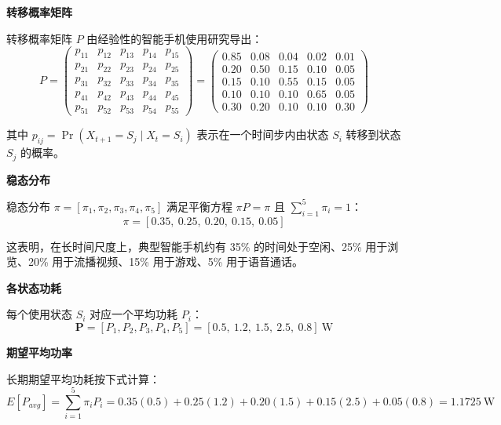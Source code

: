 \documentclass[11pt,a4paper]{ctexart}
\begin{document}
\textbf{转移概率矩阵}

转移概率矩阵 $P$ 由经验性的智能手机使用研究导出：
\begin{equation}
P = \begin{pmatrix}
p_{11} & p_{12} & p_{13} & p_{14} & p_{15}\\
p_{21} & p_{22} & p_{23} & p_{24} & p_{25}\\
p_{31} & p_{32} & p_{33} & p_{34} & p_{35}\\
p_{41} & p_{42} & p_{43} & p_{44} & p_{45}\\
p_{51} & p_{52} & p_{53} & p_{54} & p_{55}
\end{pmatrix}
= \begin{pmatrix}
0.85 & 0.08 & 0.04 & 0.02 & 0.01\\
0.20 & 0.50 & 0.15 & 0.10 & 0.05\\
0.15 & 0.10 & 0.55 & 0.15 & 0.05\\
0.10 & 0.10 & 0.10 & 0.65 & 0.05\\
0.30 & 0.20 & 0.10 & 0.10 & 0.30
\end{pmatrix} \tag{7}
\end{equation}

其中 $p_{ij} = \Pr\left(X_{t+1} = S_j \mid X_t = S_i\right)$ 表示在一个时间步内由状态 $S_i$ 转移到状态 $S_j$ 的概率。

\textbf{稳态分布}

稳态分布 $\pi = [\pi_1, \pi_2, \pi_3, \pi_4, \pi_5]$ 满足平衡方程 $\pi P = \pi$ 且 $\sum_{i=1}^{5}\pi_i = 1$：
\begin{equation}
\pi = [0.35,\ 0.25,\ 0.20,\ 0.15,\ 0.05] \tag{8}
\end{equation}

这表明，在长时间尺度上，典型智能手机约有 35\% 的时间处于空闲、25\% 用于浏览、20\% 用于流播视频、15\% 用于游戏、5\% 用于语音通话。

\textbf{各状态功耗}

每个使用状态 $S_i$ 对应一个平均功耗 $P_i$：
\begin{equation}
\mathbf{P} = [P_1, P_2, P_3, P_4, P_5] = [0.5,\ 1.2,\ 1.5,\ 2.5,\ 0.8]\ \mathrm{W} \tag{9}
\end{equation}

\textbf{期望平均功率}

长期期望平均功耗按下式计算：
\begin{equation}
E[P_{avg}] = \sum_{i=1}^{5}\pi_iP_i = 0.35(0.5) + 0.25(1.2) + 0.20(1.5) + 0.15(2.5) + 0.05(0.8) = 1.1725\ \mathrm{W} \tag{10}
\end{equation}
\end{document}
